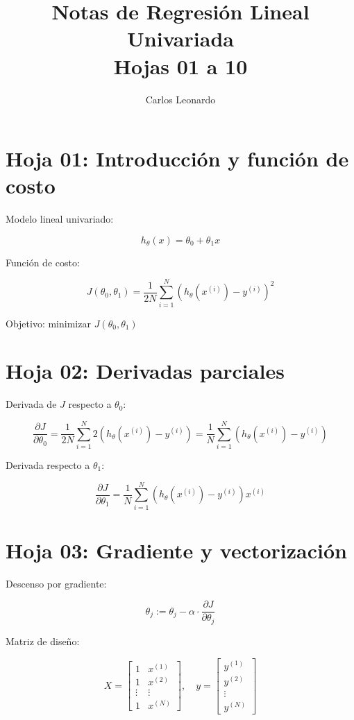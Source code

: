 \documentclass[12pt]{article}
\title{Notas de Regresión Lineal Univariada \\ Hojas 01 a 10}
\author{Carlos Leonardo}
\date{}
\begin{document}
\maketitle

\section*{Hoja 01: Introducción y función de costo}

Modelo lineal univariado:

\[
h_\theta(x) = \theta_0 + \theta_1 x
\]

Función de costo:

\[
J(\theta_0, \theta_1) = \frac{1}{2N} \sum_{i=1}^{N} \left(h_\theta(x^{(i)}) - y^{(i)}\right)^2
\]

Objetivo: minimizar \( J(\theta_0, \theta_1) \)

\section*{Hoja 02: Derivadas parciales}

Derivada de \( J \) respecto a \( \theta_0 \):

\[
\frac{\partial J}{\partial \theta_0} = \frac{1}{2N} \sum_{i=1}^N 2(h_\theta(x^{(i)}) - y^{(i)}) = \frac{1}{N} \sum_{i=1}^N (h_\theta(x^{(i)}) - y^{(i)})
\]

Derivada respecto a \( \theta_1 \):

\[
\frac{\partial J}{\partial \theta_1} = \frac{1}{N} \sum_{i=1}^N (h_\theta(x^{(i)}) - y^{(i)})x^{(i)}
\]

\section*{Hoja 03: Gradiente y vectorización}

Descenso por gradiente:

\[
\theta_j := \theta_j - \alpha \cdot \frac{\partial J}{\partial \theta_j}
\]

Matriz de diseño:

\[
X = \begin{bmatrix}
1 & x^{(1)} \\
1 & x^{(2)} \\
\vdots & \vdots \\
1 & x^{(N)}
\end{bmatrix}, \quad 
y = \begin{bmatrix}
y^{(1)} \\
y^{(2)} \\
\vdots \\
y^{(N)}
\end{bmatrix}
\]
\end{document}
